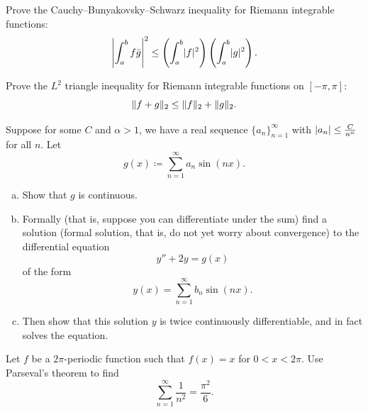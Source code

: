 \begin{exercise} \label{exercise:L2cauchyschwarz}
Prove the Cauchy--Bunyakovsky--Schwarz inequality
for Riemann integrable functions:
\begin{equation*}
{\left\lvert {\int_a^b f\bar{g}} \right\rvert}^2
\leq
\left( \int_a^b \lvert {f} \rvert^2 \right)
\left( \int_a^b \lvert {g} \rvert^2 \right) .
\end{equation*}
\end{exercise}

\begin{exercise} \label{exercise:L2triangleineq}
Prove the $L^2$ triangle inequality 
for Riemann integrable functions on $[-\pi,\pi]$:
\begin{equation*}
\lVert {f+g} \rVert_2 \leq \lVert {f} \rVert_2 + \lVert {g} \rVert_2 .
\end{equation*}
\end{exercise}

\begin{exercise}
\pagebreak[3]
Suppose for some $C$ and $\alpha > 1$, we have
a real sequence $\{ a_n \}_{n=1}^\infty$ with
$\lvert {a_n} \rvert \leq \frac{C}{n^\alpha}$ for all $n$.
Let
\begin{equation*}
g(x) \coloneqq \sum_{n=1}^\infty a_n \sin(n x) .
\end{equation*}
\begin{enumerate}[a)]
\item
Show that $g$ is continuous.
\item
Formally (that is, suppose you can differentiate under the sum)
find a solution (formal solution, that is, do not yet worry about convergence)
to the differential equation
\begin{equation*}
y''+ 2 y = g(x)
\end{equation*}
of the form
\begin{equation*}
y(x) = \sum_{n=1}^\infty b_n \sin(n x) .
\end{equation*}
\item
Then show that this solution $y$ is twice continuously differentiable,
and in fact solves the equation.
\end{enumerate}
\end{exercise}

\begin{exercise}
Let $f$ be a $2\pi$-periodic  function such
that $f(x) = x$ for $0 < x < 2\pi$.
Use Parseval's theorem to find
\begin{equation*}
\sum_{n=1}^\infty \frac{1}{n^2} = \frac{\pi^2}{6} .
\end{equation*}
\end{exercise}

